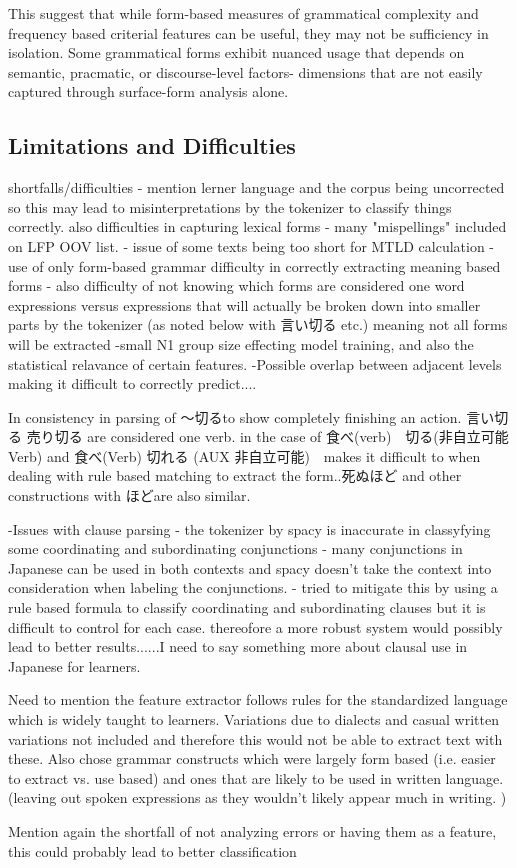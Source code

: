 This suggest that while form-based measures of grammatical complexity and frequency based criterial features can be
useful, they may not be sufficiency in isolation. Some grammatical forms exhibit nuanced usage that depends on
semantic, pracmatic, or discourse-level factors- dimensions that are not easily captured through surface-form
analysis alone.


\subsection{Limitations and Difficulties}
shortfalls/difficulties
- mention lerner language and the corpus being uncorrected so this may lead to misinterpretations by the tokenizer to classify things correctly.
    also difficulties in capturing lexical forms - many "mispellings" included on LFP OOV list.
- issue of some texts being too short for MTLD calculation
- use of only form-based grammar difficulty in correctly extracting meaning based forms
- also difficulty of not knowing which forms are considered one word expressions versus expressions that will
actually be broken down into smaller parts by the tokenizer (as noted below with 言い切る etc.) meaning not all forms
will be extracted
-small N1 group size effecting model training, and also the statistical relavance of certain features.
-Possible overlap between adjacent levels making it difficult to correctly predict....

In consistency in parsing of 〜切るto show completely finishing an action. 言い切る 売り切る are considered one verb. in the
case of 食べ(verb)　切る(非自立可能Verb) and 食べ(Verb) 切れる (AUX 非自立可能)　makes it difficult to when dealing with rule based
matching to extract the form..死ぬほど and other constructions with ほどare also similar.

-Issues with clause parsing - the tokenizer by spacy is inaccurate in classyfying some coordinating and
subordinating conjunctions - many conjunctions in Japanese can be used in both contexts and spacy doesn't take the
context into consideration when labeling the conjunctions. - tried to mitigate this by using a rule based formula to
classify coordinating and subordinating clauses but it is difficult to control for each case. thereofore a more
robust system would possibly lead to better results......I need to say something more about clausal use in Japanese
for learners.


Need to mention the feature extractor follows rules for the standardized language which is widely taught to
learners. Variations due to dialects and casual written variations not included and therefore this would not be
able to extract text with these. Also chose grammar constructs which were largely form based (i.e. easier to extract
vs. use based) and ones that are likely to be used in written language. (leaving out spoken expressions as they
wouldn't likely appear much in writing. )

Mention again the shortfall of not analyzing errors or having them as a feature, this could probably lead to better
classification